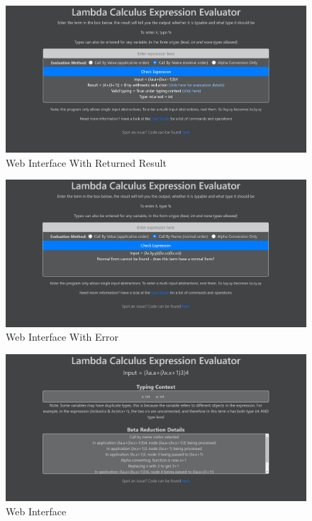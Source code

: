 \documentclass[a4paper,11pt]{report}
\begin{document}
\begin{figure}[p]
	\centering
	\includegraphics[scale=0.4]{images/web_interface_input}
	\caption{Web Interface With Returned Result}
	\label{web_interface_input}
\end{figure}

\begin{figure}[p]
	\centering
	\includegraphics[scale=0.4]{images/web_interface_error}
	\caption{Web Interface With Error}
	\label{web_interface_error}
\end{figure}

\begin{figure}[p]
	\includegraphics[scale=0.4]{images/web_interface_more_information}
	\centering
	\caption{Web Interface}
	\label{web_interface_more_information}
\end{figure}
\end{document}
